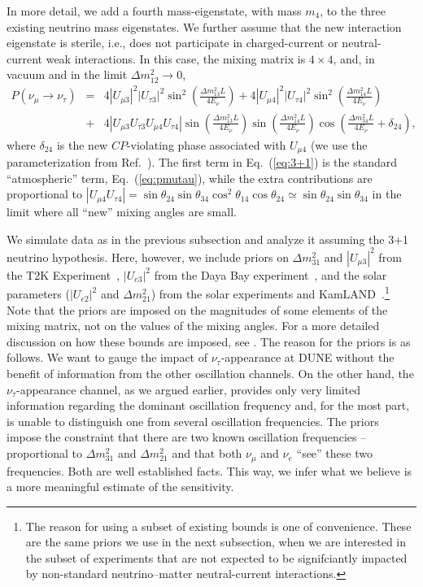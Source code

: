 \documentclass[aps,prd,onecolumn,nofootinbib,superscriptaddress, 11pt]{revtex4}
\begin{document}
In more detail, we add a fourth mass-eigenstate, with mass $m_4$, to the three existing neutrino mass eigenstates. We further assume that the new interaction eigenstate is sterile, i.e., does not participate in charged-current or neutral-current weak interactions. In this case, the mixing matrix is $4\times 4$, and, in vacuum and in the limit $\Delta m_{12}^2 \to 0$, 
\begin{eqnarray}
P(\nu_\mu \to \nu_\tau) & = & 4|U_{\mu 3}|^2 |U_{\tau 3}|^2 \sin^2{\left(\frac{\Delta m_{13}^2 L}{4E_\nu}\right)} + 4|U_{\mu 4}|^2 |U_{\tau 4}|^2 \sin^2{\left(\frac{\Delta m_{14}^2 L}{4E_\nu}\right)} \nonumber \\
& + & 4|U_{\mu 3} U_{\tau 3} U_{\mu 4} U_{\tau 4}| \sin{\left(\frac{\Delta m_{13}^2 L}{4E_\nu}\right)} \sin{\left(\frac{\Delta m_{14}^2 L}{4E_\nu}\right)} \cos{\left(\frac{\Delta m_{34}^2 L}{4E_\nu} + \delta_{24}\right)},  \label{eq:3+1}
\end{eqnarray}
where $\delta_{24}$ is the new $CP$-violating phase associated with $U_{\mu 4}$ (we use the parameterization from Ref.~\cite{Berryman:2015nua}). The first term in Eq.~(\ref{eq:3+1}) is the standard ``atmospheric'' term, Eq.~(\ref{eq:pmutau}), while the extra contributions are proportional to $|U_{\mu4}U_{\tau4}| = \sin{\theta_{24}}\sin{\theta_{34}}\cos^2{\theta_{14}}\cos{\theta_{24}} \simeq \sin{\theta_{24}} \sin{\theta_{34}}$ in the limit where  all ``new'' mixing angles are small.

We simulate data as in the previous subsection and analyze it assuming the 3+1 neutrino hypothesis. Here, however, we include priors on $\Delta m_{31}^2$ and $|U_{\mu 3}|^2$ from the T2K Experiment~\cite{Abe:2018wpn}, $|U_{e3}|^2$ from the Daya Bay experiment~\cite{Adey:2018zwh}, and the solar parameters ($|U_{e2}|^2$ and $\Delta m_{21}^2$) from the solar experiments and KamLAND~\cite{Esteban:2018azc}.\footnote{The reason for using a subset of existing bounds is one of convenience. These are the same priors we use in the next subsection, when we are interested in the subset of experiments that are not expected to be signifciantly impacted by non-standard neutrino--matter neutral-current interactions.} Note that the priors are imposed on the magnitudes of some elements of the mixing matrix, not on the values of the mixing angles. For a more detailed discussion on how these bounds are imposed, see \cite{Berryman:2015nua}. The reason for the priors is as follows. We want to gauge the impact of $\nu_{\tau}$-appearance at DUNE without the benefit of information from the other oscillation channels. On the other hand, the $\nu_{\tau}$-appearance channel, as we argued earlier, provides only very limited information regarding the dominant oscillation frequency and, for the most part, is unable to distinguish one from several oscillation frequencies. The priors impose the constraint that there are two known oscillation frequencies -- proportional to $\Delta m^2_{31}$ and $\Delta m^2_{21}$ and that both $\nu_{\mu}$ and $\nu_e$ ``see'' these two frequencies. Both are well established facts. This way, we infer what we believe is a more meaningful estimate of the sensitivity.
\end{document}
